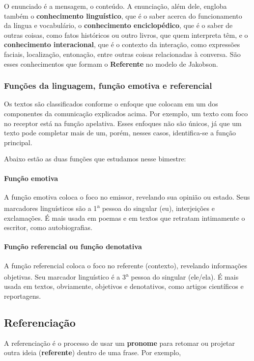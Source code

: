 \documentclass{article}
\begin{document}
O enunciado é a mensagem, o conteúdo. A enunciação, além dele, engloba também o \textbf{conhecimento linguístico}, que é o saber acerca do funcionamento da língua e vocabulário, o \textbf{conhecimento enciclopédico}, que é o saber de outras coisas, como fatos históricos ou outro livros, que quem interpreta têm, e o \textbf{conhecimento interacional}, que é o contexto da interação, como expressões faciais, localização, entonação, entre outras coisas relacionadas à conversa. São esses conhecimentos que formam o \textbf{Referente} no modelo de Jakobson.

\subsubsection{Funções da linguagem, função emotiva e referencial}
Os textos são classificados conforme o enfoque que colocam em um dos componentes da comunicação explicados acima. Por exemplo, um texto com foco no receptor está na função apelativa. Esses enfoques não são únicos, já que um texto pode completar mais de um, porém, nesses casos, identifica-se a função principal.

Abaixo estão as duas funções que estudamos nesse bimestre:

\paragraph{Função emotiva\label{femotiva}}
A função emotiva coloca o foco no emissor, revelando sua opinião ou estado. Seus marcadores linguísticos são a 1\textsuperscript{a} pessoa do singular (eu), interjeições e exclamações. É mais usada em poemas e em textos que retratam intimamente o escritor, como autobiografias.


\paragraph{Função referencial ou função denotativa}
A função referencial coloca o foco no referente (contexto), revelando informações objetivas. Seu marcador linguístico é a 3\textsuperscript{a} pessoa do singular (ele/ela). É mais usada em textos, obviamente, objetivos e denotativos, como artigos científicos e reportagens.

\subsection{Referenciação\label{referenciação}}
A referenciação é o processo de usar um \textbf{pronome} para retomar ou projetar outra ideia (\textbf{referente}) dentro de uma frase. Por exemplo,
\end{document}
